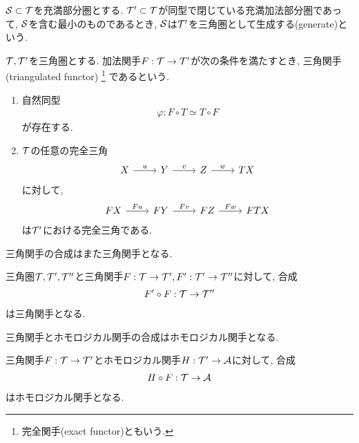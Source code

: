 \documentclass[uplatex, a4paper, 14Q, dvipdfmx]{jsarticle}
\begin{document}
\begin{definition}[生成]
  $\S \subset \T$を充満部分圏とする. 
  $\T' \subset \T$が同型で閉じている充満加法部分圏であって, $\S$を含む最小のものであるとき, $\S$は$\T'$を三角圏として生成する(generate)という. 
\end{definition}

\begin{definition}[三角関手]
  $\T, \T'$を三角圏とする. 
  加法関手$F: \T \to \T'$が次の条件を満たすとき, 三角関手(triangulated functor)
  \footnote{
    完全関手(exact functor)ともいう. 
  }
  であるという.
  \begin{enumerate}
    \item 自然同型
    \begin{align*}
      \varphi: F \circ T \simeq T \circ F
    \end{align*}
    が存在する. 
    \item $\T$の任意の完全三角
    \[\begin{tikzcd}
      X & Y & Z & TX
      \arrow["u", from=1-1, to=1-2]
      \arrow["v", from=1-2, to=1-3]
      \arrow["w", from=1-3, to=1-4]
    \end{tikzcd}\]
    に対して, 
    \[\begin{tikzcd}
      FX & FY & FZ & FTX
      \arrow["Fu", from=1-1, to=1-2]
      \arrow["Fv", from=1-2, to=1-3]
      \arrow["Fw", from=1-3, to=1-4]
    \end{tikzcd}\]
    は$\T'$における完全三角である. 
  \end{enumerate}
\end{definition}

三角関手の合成はまた三角関手となる. 

\begin{lemma}
  三角圏$\T, \T', \T''$と三角関手$F: \T \to \T', F': \T' \to \T''$に対して, 合成
  \begin{align*}
    F' \circ F: \T \to \T''
  \end{align*}
  は三角関手となる. 
\end{lemma}

三角関手とホモロジカル関手の合成はホモロジカル関手となる. 

\begin{lemma}
  三角関手$F: \T \to \T'$とホモロジカル関手$H: \T' \to \A$に対して, 合成
  \begin{align*}
    H \circ F: \T \to \A
  \end{align*}
  はホモロジカル関手となる. 
\end{lemma}
\end{document}
